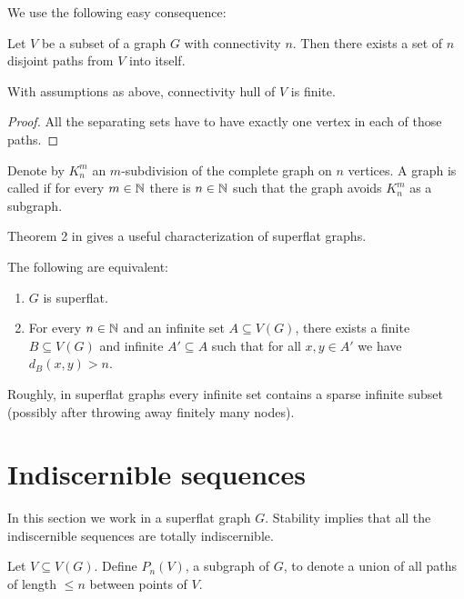 We use the following easy consequence:

\begin{Corollary} \label{cr_disjoint_paths}
  Let $V$ be a subset of a graph $G$ with connectivity $n$. Then there exists a set of $n$ disjoint paths from $V$ into itself.
\end{Corollary}

\begin{Corollary} \label{cr_hull_finite}
  With assumptions as above, connectivity hull of $V$ is finite.
\end{Corollary}

\begin{proof}
  All the separating sets have to have exactly one vertex in each of those paths. 
\end{proof}

\begin{Definition}
  Denote by $K^m_n$ an $m$-subdivision of the complete graph on $n$ vertices.
  A graph is called  if for every $m \in \mathbb{N}$ there is $n \in \mathbb{N}$ such that the graph avoids $K^m_n$ as a subgraph. 
\end{Definition}

Theorem 2 in \cite{stable_graphs} gives a useful characterization of superflat graphs.

\begin{Theorem} \label{th_superflat_equivalence}
  The following are equivalent:
  \begin{enumerate}
  \item $G$ is superflat.
  \item For every $n \in \mathbb{N}$ and an infinite set $A \subseteq V(G)$, there exists a finite $B \subseteq V(G)$ and infinite $A' \subseteq A$ such that for all $x,y \in A'$ we have $d_{B}(x, y) > n$.
  \end{enumerate}
\end{Theorem}

Roughly, in superflat graphs every infinite set contains a sparse infinite subset (possibly after throwing away finitely many nodes).

\section{Indiscernible sequences}

In this section we work in a superflat graph $G$. Stability implies that all the indiscernible sequences are totally indiscernible.

\begin{Definition}
  Let $V \subseteq V(G)$. Define $P_n(V)$, a subgraph of $G$, to denote a union of all paths of length $\leq n$ between points of $V$.
\end{Definition}

